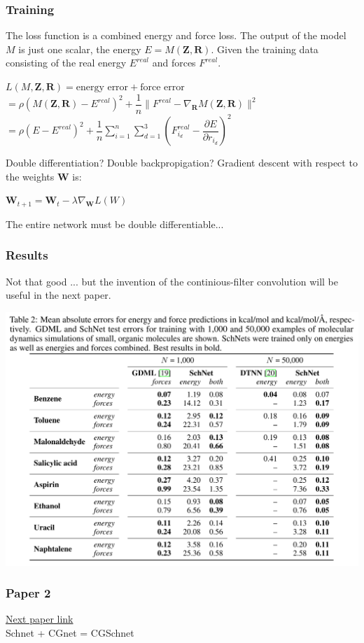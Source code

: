 \documentclass{beamer}
\begin{document}
\begin{frame}
  \frametitle{Training}
  The loss function is a combined energy and force loss. The output of the model $M$ is just one scalar, the energy $E = M(\mathbf{Z}, \mathbf{R})$. Given the training data consisting of the real energy $E^{real}$ and forces $F^{real}$.
  \begin{center}
    $L(M, \mathbf{Z}, \mathbf{R}) = \text{energy error} + \text{force error}$\\
    $= \rho(M(\mathbf{Z}, \mathbf{R}) - E^{real})^2 + \dfrac{1}{n} \| F^{real} - \nabla_{\mathbf{R}}M(\mathbf{Z}, \mathbf{R}) \|^2$\\
    $= \rho(E - E^{real})^2 + \dfrac{1}{n} \sum^n_{i=1} \sum^3_{d=1} ( F^{real}_{i_d} - \dfrac{\partial E}{\partial r_{i_d}} )^2$
  \end{center}
  \begin{block}{Double differentiation? Double backpropigation?}
    Gradient descent with respect to the weights $\mathbf{W}$ is:
    \begin{center}
      $\mathbf{W}_{t+1} = \mathbf{W}_t - \lambda \nabla_{\mathbf{W}} L(W)$
    \end{center}
    The entire network must be double differentiable...
  \end{block}
\end{frame}
\begin{frame}
  \frametitle{Results}
  Not that good ... but the invention of the continious-filter convolution will be useful in the next paper.
  \begin{center}
    \includegraphics[width=0.7\linewidth]{./paper1_results.png}
  \end{center}
\end{frame}
\begin{frame}
  \frametitle{Paper 2}
  \huge \href{https://arxiv.org/abs/2007.11412}{Next paper link}\\
  \huge Schnet + CGnet = CGSchnet
\end{frame}
\end{document}
